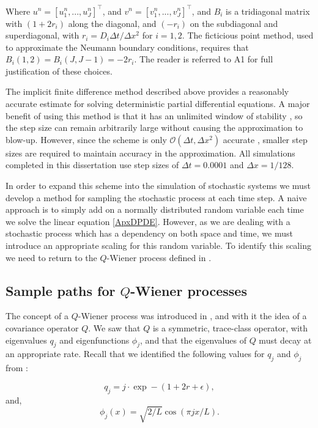 \documentclass[12pt]{article}
\begin{document}
Where $u^n = [u^n_1,...,u^n_J]^\intercal$, and $v^n = [v^n_1,...,v^n_J]^\intercal$, and $B_i$ is a tridiagonal matrix with $(1+2r_i)$ along the diagonal, and $(-r_i)$ on the subdiagonal and superdiagonal, with $r_i = D_i \Delta t / \Delta x^2$ for $i = 1,2$. The ficticious point method, used to approximate the Neumann boundary conditions, requires that $B_i(1,2) = B_i(J,J-1) = -2r_i$. The reader is referred to A1 for full justification of these choices.

The implicit finite difference method described above provides a reasonably accurate estimate for solving deterministic partial differential equations. A major benefit of using this method is that it has an unlimited window of stability \cite{Iserles}, so the step size can remain arbitrarily large without causing the approximation to blow-up. However, since the scheme is only $\mathcal{O}(\Delta t, \Delta x^2)$ accurate \cite{Iserles}, smaller step sizes are required to maintain accuracy in the approximation. All simulations completed in this dissertation use step sizes of $\Delta t = 0.0001$ and $\Delta x = 1/128$.

In order to expand this scheme into the simulation of stochastic systems we must develop a method for sampling the stochastic process at each time step. A naive approach is to simply add on a normally distributed random variable each time we solve the linear equation \eqref{ApxDPDE}. However, as we are dealing with a stochastic process which has a dependency on both space and time, we must introduce an appropriate scaling for this random variable. To identify this scaling we need to return to the $Q$-Wiener process defined in .  

\subsection{Sample paths for $Q$-Wiener processes}
 The concept of a $Q$-Wiener process was introduced in , and with it the idea of a covariance operator $Q$. We saw that $Q$ is a symmetric, trace-class operator, with eigenvalues $q_j$ and eigenfunctions $\phi_j$, and that the eigenvalues of $Q$ must decay at an appropriate rate. Recall that we identified the following values for $q_j$ and $\phi_j$ from \cite{Lord}:
 
 \begin{equation*}
    q_j = j\cdot\exp-\left(1+2r+\epsilon\right),
\end{equation*}
and,
\begin{equation*}
\phi_j(x) = \sqrt{2/L}\cos(\pi jx/L).    
\end{equation*}
 
\end{document}
